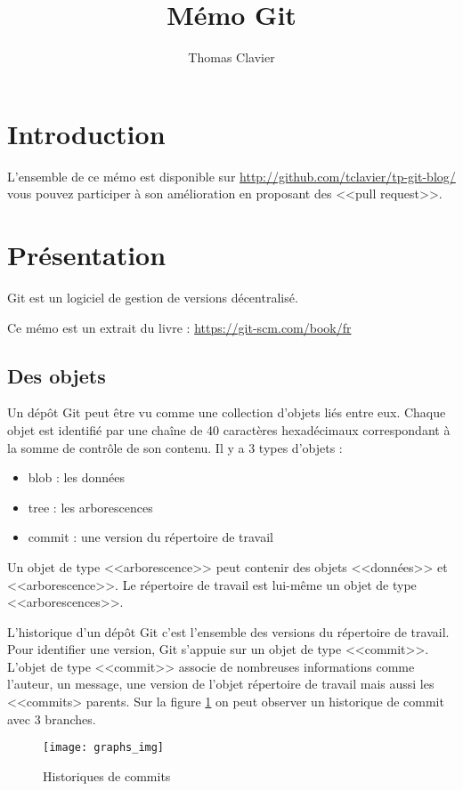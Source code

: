\documentclass[a4paper]{article}
\title{Mémo Git}
\author{Thomas Clavier}
\date{}
\begin{document}
\maketitle

\section*{Introduction}

L'ensemble de ce mémo est disponible sur \url{http://github.com/tclavier/tp-git-blog/} vous pouvez participer à son amélioration en proposant des <<pull request>>.

\section*{Présentation}

Git est un logiciel de gestion de versions décentralisé.

Ce mémo est un extrait du livre : \url{https://git-scm.com/book/fr}

\subsection*{Des objets}
Un dépôt Git peut être vu comme une collection d’objets liés entre eux. 
Chaque objet est identifié par une chaîne de 40 caractères hexadécimaux correspondant à la somme de contrôle de son contenu. 
Il y a 3 types d'objets : 
\begin{itemize}
\item blob : les données
\item tree : les arborescences
\item commit : une version du répertoire de travail
\end{itemize}
Un objet de type <<arborescence>> peut contenir des objets <<données>> et <<arborescence>>.
Le répertoire de travail est lui-même un objet de type <<arborescences>>. 

L'historique d'un dépôt Git c'est l'ensemble des versions du répertoire de travail. Pour identifier une version, Git s'appuie sur un objet de type <<commit>>. 
L'objet de type <<commit>> associe de nombreuses informations comme l'auteur, un message, une version de l'objet répertoire de travail mais aussi les <<commits> parents. 
Sur la figure \ref{graphs} on peut observer un historique de commit avec 3 branches.

\begin{figure}[ht]
  \center
  \texttt{[image: graphs\_img]}
  \caption{Historiques de commits}
  \label{graphs}
\end{figure}
\end{document}
